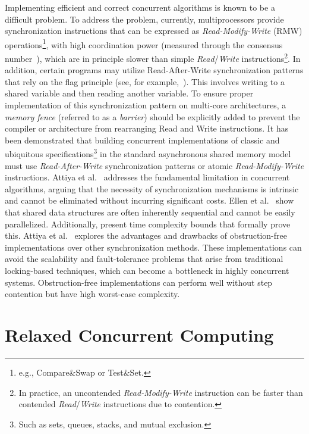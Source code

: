 Implementing efficient and correct concurrent algorithms is known to be a difficult problem.
To address the problem, currently, multiprocessors provide synchronization instructions that can be expressed as \textit{Read-Modify-Write} (RMW) operations\footnote{e.g., Compare\&Swap or Test\&Set.}, with high coordination power (measured through the consensus number~\cite{DBLP_journals_toplas_Herlihy91}), which are in principle slower than simple \textit{Read}/\textit{Write} instructions\footnote{In practice, an uncontended \textit{Read-Modify-Write} instruction can be faster than contended \textit{Read}/\textit{Write} instructions due to contention.}. In addition, certain programs may utilize Read-After-Write synchronization patterns that rely on the flag principle (see, for example,~\cite {DBLP_books_daglib_0020056}). This involves writing to a shared variable and then reading another variable. To ensure proper implementation of this synchronization pattern on multi-core architectures, a \textit{memory fence} (referred to as a \textit{barrier}) should be explicitly added to prevent the compiler or architecture from rearranging Read and Write instructions. It has been demonstrated that building concurrent implementations of classic and ubiquitous specifications\footnote{Such as sets, queues, stacks, and mutual exclusion.} in the standard asynchronous shared memory model must use \textit{Read-After-Write} synchronization patterns or atomic \textit{Read-Modify-Write} instructions. Attiya et al.~\cite{DBLP_conf_popl_AttiyaGHKMV11} addresses the fundamental limitation in concurrent algorithms, arguing that the necessity of synchronization mechanisms is intrinsic and cannot be eliminated without incurring significant costs. Ellen et al.~\cite{DBLP_journals_siamcomp_EllenHS12} show that shared data structures are often inherently sequential and cannot be easily parallelized. Additionally, present time complexity bounds that formally prove this. Attiya et al.~\cite{DBLP_journals_jacm_AttiyaGHK09} explores the advantages and drawbacks of obstruction-free implementations over other synchronization methods. These implementations can avoid the scalability and fault-tolerance problems that arise from traditional locking-based techniques, which can become a bottleneck in highly concurrent systems. Obstruction-free implementations can perform well without step contention but have high worst-case complexity.

\section{\label{section:relaxed-concurrent}Relaxed Concurrent Computing}

